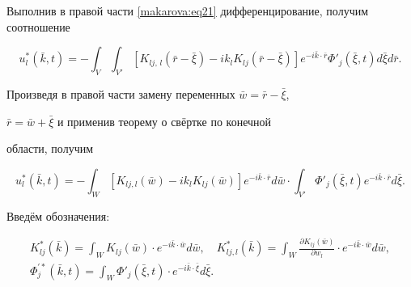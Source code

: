 Выполнив в правой части \eqref{makarova:eq21} дифференцирование, получим соотношение

\begin{equation}

\label{makarova:eq22}

u_l^\ast (\bar {k} , t)=-\int_V

\int_{V'} \left[ K_{lj,\,l} (\bar {r}-\bar {\xi })-ik_l

K_{lj} (\bar {r}-\bar {\xi })\right] e^{-i\bar {k}\cdot

\bar {r}} \Phi'_j (\bar {\xi } , t)d\bar {\xi} d\bar {r}.

\end{equation}

Произведя в правой части замену переменных $\bar {w}=\bar {r}-\bar {\xi }$,

$\bar {r}=\bar {w}+\bar {\xi }$ и применив теорему о свёртке по конечной

области, получим

\begin{equation}

\label{makarova:eq23}

u_l^\ast (\bar {k} , t)=-\int_W \left[K_{lj,l} (\bar {w})-ik_l K_{lj} (\bar {w})\right]

e^{-i\bar {k}\cdot \bar {r}} d\bar {w} \cdot \int_{V'} \Phi'_j (\bar {\xi} , t) e^{-i \bar

{k}\cdot \bar {r}} d\bar {\xi }.

\end{equation}



Введём обозначения:

\begin{equation}

\label{makarova:eq24}

\begin{array}{c}

\displaystyle

K_{lj}^\ast (\bar {k})=\int_W K_{lj} (\bar {w}) \cdot e^{-i \bar

{k}\cdot \bar {w}} d \bar {w}, \quad 

K_{lj,l}^\ast (\bar {k})=\int_W \frac{\partial K_{lj} (\bar

{w})}{\partial w_l }\cdot e^{-i \bar {k}\cdot \bar {w}}d\bar {w}, \\

\displaystyle

 \Phi^{'\ast}_j (\bar {k} , t)=\int_W \Phi'_j (\bar {\xi } , t)

\cdot e^{-i \bar {k}\cdot \bar {\xi }}d\bar {\xi }.

\end{array}

\end{equation}

